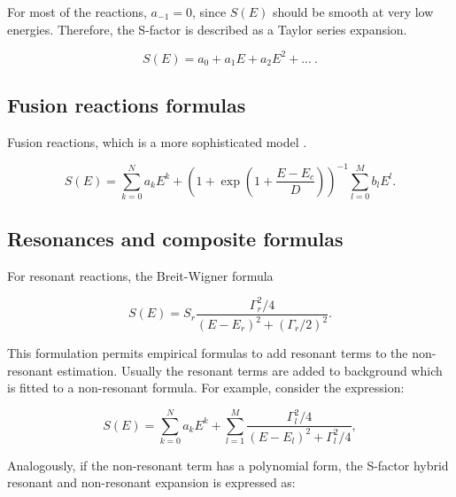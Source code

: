 \documentclass[openany]{book}
\begin{document}
For most of the reactions, $a_{-1} = 0$, since $S(E)$ should be smooth at very low energies. Therefore, the S-factor is  described as a Taylor series expansion.

\begin{equation}  \label{eq:empirical_polynomial}
	S(E) = a_0 + a_1E + a_2 E^2 + ... \ .
\end{equation}

\subsection{Fusion reactions formulas} \label{sub:empirical_fusion}

Fusion reactions, which is a more sophisticated model \cite{beard_afanasjev_chamon_gasques_wiescher_yakovlev_2010}.

\begin{equation} \label{eq:empirical_yakovlev}
	S(E) = \sum_{k=0}^{N} {a_kE^k} + \left(1 + \exp{\left(1 +  \frac{E - E_c}{D}\right)}\right)^{-1} \sum_{l=0}^{M} {b_lE^l}  .
\end{equation}


\subsection{Resonances and composite formulas} \label{sub:empirical_resonances}


For resonant reactions, the Breit-Wigner formula

\begin{equation} \label{eq:empirical_breitWigner}
	S(E) = S_r \frac{\Gamma^2_r/4}{(E-E_r)^2 + (\Gamma_r/2)^2}.
\end{equation}

This formulation permits empirical formulas to add resonant terms to the non-resonant estimation. Usually the resonant terms are added to background which is fitted to a non-resonant formula. For example, consider the expression: 

\begin{equation}  \label{eq:empirical_hybridPolynomial}
	S(E) =  \sum _{k = 0}^{N} {a_kE^k} + \sum_{l = 1}^{M} {\frac{\Gamma_l^2/4}{(E - E_l)^2 + \Gamma_l^2/4}},
\end{equation}

Analogously, if the non-resonant term has a polynomial form, the S-factor hybrid resonant and non-resonant expansion is expressed as:
\end{document}
